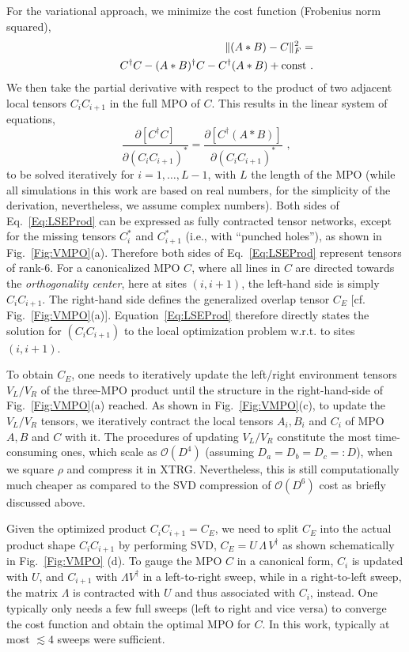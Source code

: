 \documentclass[aps,prx,twocolumn,showpacs,psfig,superscriptaddress,longbibliography]{revtex4-1}
\newcommand{\order}[1]{\mathcal{O}{\left(#1\right)}}
\newcommand{\Eq}[1]{Eq.~\eqref{#1}}
\newcommand{\EQ}[1]{Equation~\eqref{#1}}
\newcommand{\Fig}[1]{Fig.~\ref{#1}}
\begin{document}
For the variational approach, we minimize the cost function
(Frobenius norm squared),
%
\begin{eqnarray}
   && \Vert (A\ast B) - C \Vert_F^2 = \notag \\
   && \ \ \ C^{\dagger}C - (A\ast B)^{\dagger}C-C^{\dagger}(A\ast B) +
   \mathrm{const}
\text{ .}\label{eq:MPO:prod}
\end{eqnarray}
%
We then take the partial derivative with respect to the product of
two adjacent local tensors $C_i C_{i+1}$ in the full MPO of $C$.
This results in the linear system of equations,
%
\begin{equation}
   \frac{\partial [C^{\dagger} C]}{\partial (C_i C_{i+1})^\ast} =
   \frac{\partial[C^{\dagger} (A\ast B)]}{\partial (C_i C_{i+1})^\ast}
\text{ ,} 
\label{Eq:LSEProd}
\end{equation} 
%
to be solved iteratively for $i=1, \ldots, L-1$, with $L$ the length
of the MPO (while all simulations in this work are based on real
numbers, for the simplicity of the derivation, nevertheless, we
assume complex numbers).  Both sides of \Eq{Eq:LSEProd} can be
expressed as fully contracted tensor networks, except for the
missing tensors $C_i^\ast$ and $C_{i+1}^\ast$ (i.e., with ``punched
holes''), as shown in \Fig{Fig:VMPO}(a).  Therefore both sides of
\Eq{Eq:LSEProd} represent tensors of rank-6.  For a canonicalized
MPO $C$, where all lines in $C$ are directed towards the {\it
orthogonality center}, here at sites $(i,i+1)$, the left-hand side
is simply $C_i C_{i+1}$.  The right-hand side defines {the}
{generalized overlap} tensor $C_E$ [cf. \Fig{Fig:VMPO}(a)].
\EQ{Eq:LSEProd} therefore directly states the solution for $(C_i
C_{i+1})$ to the local optimization problem w.r.t.  to sites
$(i,i+1)$.

To obtain $C_E$, one needs to iteratively update the left/right
environment tensors $V_L/V_R$ of the three-MPO product until the
structure in the right-hand-side of \Fig{Fig:VMPO}(a) reached.  As
shown in \Fig{Fig:VMPO}(c), to update the $V_L/V_R$ tensors, we
iteratively contract the local tensors $A_i, B_i$ and $C_i$ of MPO
$A, B$ and $C$ with it. The procedures of updating $V_L/V_R$
constitute the most time-consuming ones, which scale as
$\order{D^4}$ (assuming $D_a=D_b=D_c=:D$), when we square $\rho$ and
compress it in XTRG.  Nevertheless, this is still computationally
much cheaper as compared to the SVD compression of $\order{D^6}$
cost as briefly discussed above. 

Given the optimized product $C_i C_{i+1} = C_E$, we need to split
$C_E$ into the actual product shape $C_i C_{i+1}$ by performing SVD,
$C_E = U \, \Lambda\, V^{\dagger}$ as shown {schematically} in
\Fig{Fig:VMPO}  {(d)}.  To gauge the MPO $C$ in a canonical form,
$C_i$ is updated with $U$, and $C_{i+1}$ with $\Lambda V^{\dagger}$
in a left-to-right sweep, while in a right-to-left sweep, the matrix
$\Lambda$ is contracted with $U$ and thus associated with $C_i$,
instead.  One typically only needs a few full sweeps (left to right
and vice versa) to converge the cost function and obtain the optimal
MPO for $C$. In this work, typically at most $\lesssim 4$
sweeps were sufficient.
\end{document}
